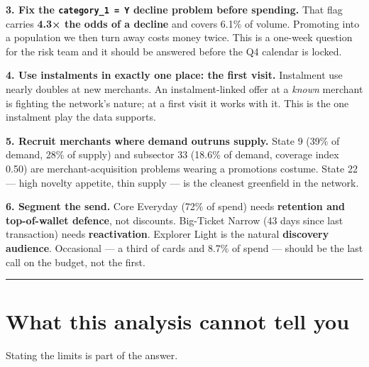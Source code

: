 \documentclass[
]{article}
\begin{document}
\textbf{3. Fix the \texttt{category\_1\ =\ Y} decline problem before
spending.} That flag carries \textbf{4.3× the odds of a decline} and
covers 6.1\% of volume. Promoting into a population we then turn away
costs money twice. This is a one-week question for the risk team and it
should be answered before the Q4 calendar is locked.

\textbf{4. Use instalments in exactly one place: the first visit.}
Instalment use nearly doubles at new merchants. An instalment-linked
offer at a \emph{known} merchant is fighting the network's nature; at a
first visit it works with it. This is the one instalment play the data
supports.

\textbf{5. Recruit merchants where demand outruns supply.} State 9 (39\%
of demand, 28\% of supply) and subsector 33 (18.6\% of demand, coverage
index 0.50) are merchant-acquisition problems wearing a promotions
costume. State 22 --- high novelty appetite, thin supply --- is the
cleanest greenfield in the network.

\textbf{6. Segment the send.} Core Everyday (72\% of spend) needs
\textbf{retention and top-of-wallet defence}, not discounts. Big-Ticket
Narrow (43 days since last transaction) needs \textbf{reactivation}.
Explorer Light is the natural \textbf{discovery audience}. Occasional
--- a third of cards and 8.7\% of spend --- should be the last call on
the budget, not the first.

\begin{center}\rule{0.5\linewidth}{0.5pt}\end{center}

\section{What this analysis cannot tell
you}\label{what-this-analysis-cannot-tell-you}

Stating the limits is part of the answer.
\end{document}
